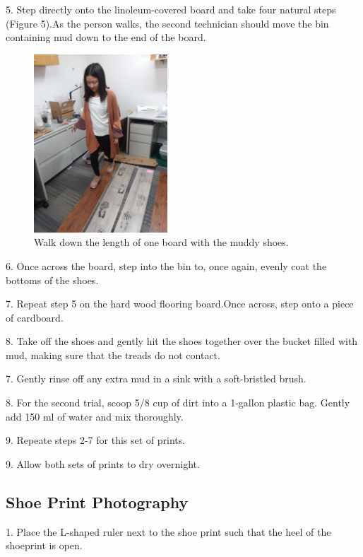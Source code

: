 \newpage

5. Step directly onto the linoleum-covered board and take four natural steps (Figure 5).As the person walks, the second technician should move the bin containing mud down to the end of the board.  

\begin{figure}[!htp]
\centering
\includegraphics[width=5cm]{Mud_Step}
\caption{Walk down the length of one board with the muddy shoes. }
\label{Image 5}
\end{figure}

\newpage

6. Once across the board, step into the bin to, once again, evenly coat the bottoms of the shoes.

7. Repeat step 5 on the hard wood flooring board.Once across, step onto a piece of cardboard.

8. Take off the shoes and gently hit the shoes together over the bucket filled with mud, making sure that the treads do not contact.

7. Gently rinse off any extra mud in a sink with a soft-bristled brush.

8. For the second trial, scoop 5/8 cup of dirt into a 1-gallon plastic bag. Gently add 150 ml of  water and mix thoroughly.

9. Repeate steps 2-7 for this set of prints. 

9. Allow both sets of prints to dry overnight.


\subsection{Shoe Print Photography}

1. Place the L-shaped ruler next to the shoe print such that the heel of the shoeprint is open.


